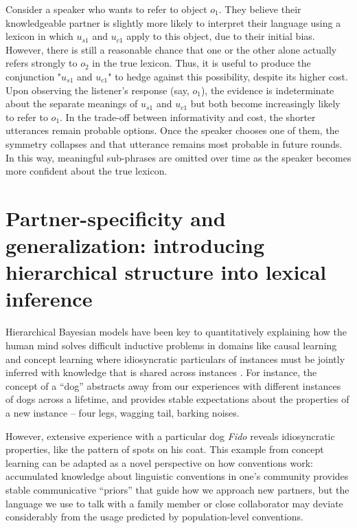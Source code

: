 Consider a speaker who wants to refer to object $o_1$. They believe their knowledgeable partner is slightly more likely to interpret their language using a lexicon in which $u_{s1}$ and $u_{c1}$ apply to this object, due to their initial bias. However, there is still a reasonable chance that one or the other alone actually refers strongly to $o_2$ in the true lexicon. Thus, it is useful to produce the conjunction "$u_{s1}$ and $u_{c1}$" to hedge against this possibility, despite its higher cost. Upon observing the listener's response (say, $o_1$), the evidence is indeterminate about the separate meanings of $u_{s1}$ and $u_{c1}$ but both become increasingly likely to refer to $o_1$. In the trade-off between informativity and cost, the shorter utterances remain probable options. Once the speaker chooses one of them, the symmetry collapses and that utterance remains most probable in future rounds. In this way, meaningful sub-phrases are omitted over time as the speaker becomes more confident about the true lexicon. 

\section{Partner-specificity and generalization: introducing hierarchical structure into lexical inference}

Hierarchical Bayesian models have been key to quantitatively explaining how the human mind solves difficult inductive problems in domains like causal learning and concept learning where idiosyncratic particulars of instances must be jointly inferred with knowledge that is shared across instances .
For instance, the concept of a ``dog'' abstracts away from our experiences with different instances of dogs across a lifetime, and provides stable expectations about the properties of a new instance -- four legs, wagging tail, barking noises.

However, extensive experience with a particular dog \emph{Fido} reveals idiosyncratic properties, like the pattern of spots on his coat.
This example from concept learning can be adapted as a novel perspective on how conventions work: accumulated knowledge about linguistic conventions in one's community provides stable communicative ``priors'' that guide how we approach new partners, but the language we use to talk with a family member or close collaborator may deviate considerably from the usage predicted by population-level conventions.

